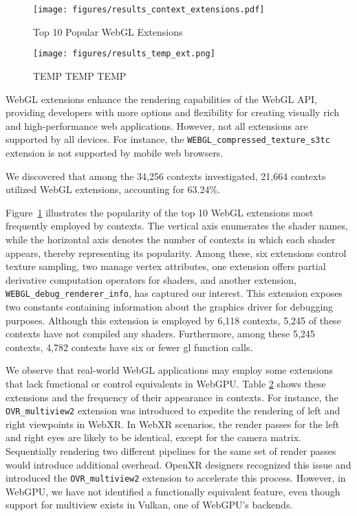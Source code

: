 \begin{figure}[tp]
\centering
\texttt{[image: figures/results\_context\_extensions.pdf]}
\caption{Top 10 Popular WebGL Extensions}\label{fig_context_ext}
\end{figure}

\begin{figure}[tp]
\centering
\texttt{[image: figures/results\_temp\_ext.png]}
\caption{TEMP TEMP TEMP}\label{fig_temp_ext}
\end{figure}

WebGL extensions enhance the rendering capabilities of the WebGL API, providing developers with more options and flexibility for creating visually rich and high-performance web applications. However, not all extensions are supported by all devices. For instance, the \texttt{WEBGL\_compressed\_texture\_s3tc} extension is not supported by mobile web browsers.

We discovered that among the 34,256 contexts investigated, 21,664 contexts utilized WebGL extensions, accounting for 63.24\%.

Figure\ \ref{fig_context_ext} illustrates the popularity of the top 10 WebGL extensions most frequently employed by contexts. The vertical axis enumerates the shader names, while the horizontal axis denotes the number of contexts in which each shader appears, thereby representing its popularity. Among these, six extensions control texture sampling, two manage vertex attributes, one extension offers partial derivative computation operators for shaders, and another extension, \texttt{WEBGL\_debug\_renderer\_info}, has captured our interest. This extension exposes two constants containing information about the graphics driver for debugging purposes. Although this extension is employed by 6,118 contexts, 5,245 of these contexts have not compiled any shaders. Furthermore, among these 5,245 contexts, 4,782 contexts have six or fewer gl function calls.

We observe that real-world WebGL applications may employ some extensions that lack functional or control equivalents in WebGPU\@. Table \ref{fig_temp_ext} shows these extensions and the frequency of their appearance in contexts. For instance, the \texttt{OVR\_multiview2} extension was introduced to expedite the rendering of left and right viewpoints in WebXR\@. In WebXR scenarios, the render passes for the left and right eyes are likely to be identical, except for the camera matrix. Sequentially rendering two different pipelines for the same set of render passes would introduce additional overhead. OpenXR designers recognized this issue and introduced the \texttt{OVR\_multiview2} extension to accelerate this process. However, in WebGPU, we have not identified a functionally equivalent feature, even though support for multiview exists in Vulkan, one of WebGPU's backends.

